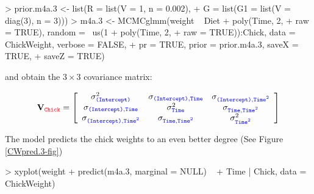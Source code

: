 \documentclass{article}
\begin{document}
\begin{Schunk}
\begin{Sinput}
> prior.m4a.3 <- list(R = list(V = 1, n = 0.002), 
+     G = list(G1 = list(V = diag(3), n = 3)))
> m4a.3 <- MCMCglmm(weight ~ Diet + poly(Time, 2, 
+     raw = TRUE), random = ~us(1 + poly(Time, 2, 
+     raw = TRUE)):Chick, data = ChickWeight, verbose = FALSE, 
+     pr = TRUE, prior = prior.m4a.3, saveX = TRUE, 
+     saveZ = TRUE)
\end{Sinput}
\end{Schunk}

and obtain the $3\times3$ covariance matrix:

\begin{displaymath}
{\bf V}_{{\color{red} \texttt{Chick}}}=
\left[
\begin{array}{ccc}
\sigma^{2}_{\color{blue}\texttt{(Intercept)}}&\sigma_{\color{blue}\texttt{(Intercept)}, \texttt{Time}}&\sigma_{\color{blue}\texttt{(Intercept)}, \texttt{Time$^{2}$}}\\
\sigma_{\color{blue}\texttt{(Intercept)}, \texttt{Time}}&\sigma^{2}_{\color{blue} \texttt{Time}}&\sigma_{\color{blue}\texttt{Time}, \texttt{Time$^{2}$}}\\
\sigma_{\color{blue}\texttt{(Intercept)}, \texttt{Time$^2$}}&\sigma_{\color{blue}\texttt{Time}, \texttt{Time$^{2}$}}&\sigma^{2}_{\color{blue} \texttt{Time$^2$}}\\
\end{array}
\right]
\end{displaymath}

The model predicts the chick weights to an even better degree  (See Figure \ref{CWpred.3-fig})

\begin{Schunk}
\begin{Sinput}
> xyplot(weight + predict(m4a.3, marginal = NULL) ~ 
+     Time | Chick, data = ChickWeight)
\end{Sinput}
\end{Schunk}
\end{document}
